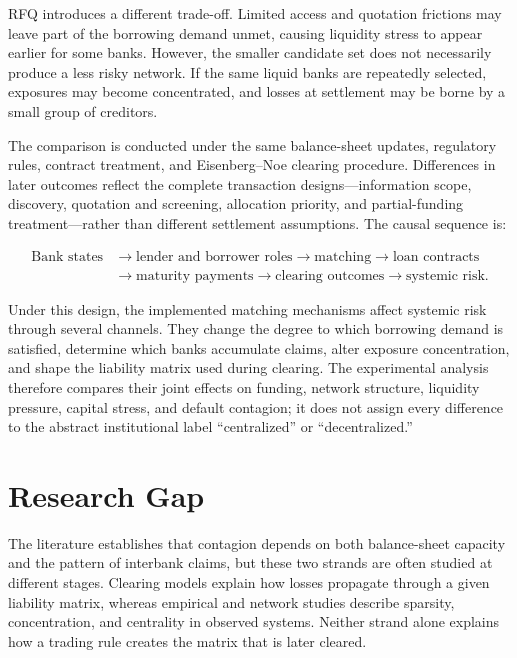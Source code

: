 RFQ introduces a different trade-off. Limited access and quotation
frictions may leave part of the borrowing demand unmet, causing
liquidity stress to appear earlier for some banks. However, the smaller
candidate set does not necessarily produce a less risky network. If the
same liquid banks are repeatedly selected, exposures may become
concentrated, and losses at settlement may be borne by a small group of
creditors.

The comparison is conducted under the same balance-sheet updates,
regulatory rules, contract treatment, and Eisenberg--Noe clearing
procedure. Differences in later outcomes reflect the complete transaction
designs---information scope, discovery, quotation and screening, allocation
priority, and partial-funding treatment---rather than different settlement
assumptions. The causal sequence is:


\begin{equation}
\begin{aligned}
\text{Bank states}&\rightarrow\text{lender and borrower roles}\rightarrow\text{matching}\rightarrow\text{loan contracts}\\
&\rightarrow\text{maturity payments}\rightarrow\text{clearing outcomes}\rightarrow\text{systemic risk}.
\end{aligned}
\end{equation}


Under this design, the implemented matching mechanisms affect systemic
risk through several channels. They change the degree to which borrowing
demand is satisfied, determine which banks accumulate claims, alter
exposure concentration, and shape the liability matrix used during
clearing. The experimental analysis therefore compares their joint
effects on funding, network structure, liquidity pressure, capital stress,
and default contagion; it does not assign every difference to the abstract
institutional label ``centralized'' or ``decentralized.''

\section{Research Gap}

The literature establishes that contagion depends on both balance-sheet
capacity and the pattern of interbank claims, but these two strands are
often studied at different stages. Clearing models explain how losses
propagate through a given liability matrix, whereas empirical and
network studies describe sparsity, concentration, and centrality in
observed systems. Neither strand alone explains how a trading rule
creates the matrix that is later cleared.

